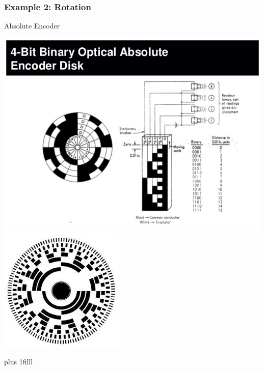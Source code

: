 \documentclass[fleqn]{beamer} %
\newcommand{\sectionIsubsectionIVtitle}{Example 2: Rotation}
\newcommand{\btVFill}{\vskip0pt plus 1filll}
\begin{document}
			\begin{frame}
				\frametitle{\sectionIsubsectionIVtitle}
				
				Absolute Encoder  
	
				\includegraphics[scale=.35]{images/lecture1_fig1.jpg}	
				\includegraphics[scale=.25]{images/lecture1_fig2.jpg}

				\btVFill

			\end{frame}
\end{document}
